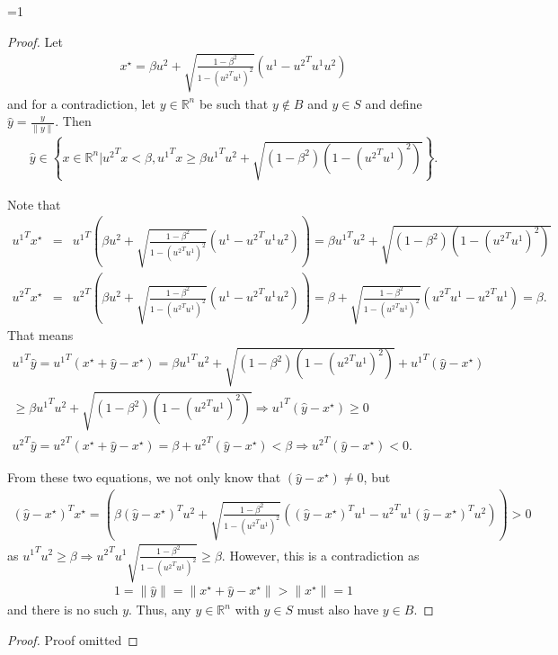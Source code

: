 \documentclass{article}
\theoremstyle{case}
\newcommand{\rn}{{\mathbb R^{n}}}
\def\includeproofs{1}
\begin{document}
\ifnum\includeproofs=1
\begin{proof}
Let 
\begin{align*}
x^{\star} = \beta u^2 + \sqrt{\frac{1 - \beta^2}{1 - ({u^2}^Tu^1)^2}} (u^1 - {u^2}^Tu^1 u^2 )
\end{align*} and for a contradiction, let $y \in \rn$ be such that $y \not \in B$ and $y \in S$ and define $\hat y = \frac{y}{\|y\|}$.
Then
\begin{align*}
\hat y \in \left\{x \in \rn | {u^2}^Tx < \beta, {u^1}^Tx \ge \beta {u^1}^Tu^2 + \sqrt{(1 - \beta^2)\left(1 - ({u^2}^Tu^1)^2\right)} \right\}.
\end{align*}

Note that
\begin{align}
{u^1}^Tx^{\star} &=& {u^1}^T\left(\beta u^2 + \sqrt{\frac{1 - \beta^2}{1 - ({u^2}^Tu^1)^2}} (u^1 - {u^2}^Tu^1 u^2 )\right) = 
\beta {u^1}^Tu^2 + \sqrt{(1 - \beta^2)\left(1 - ({u^2}^Tu^1)^2\right)} \\
{u^2}^Tx^{\star} &=& {u^2}^T\left(\beta u^2 + \sqrt{\frac{1 - \beta^2}{1 - ({u^2}^Tu^1)^2}} (u^1 - {u^2}^Tu^1 u^2 )\right) = 
\beta + \sqrt{\frac{1 - \beta^2}{1 - ({u^2}^Tu^1)^2}} ({u^2}^Tu^1 - {u^2}^Tu^1 ) = \beta.
\end{align}
That means
\begin{align}
{u^1}^T\hat y = {u^1}^T\left(x^{\star} + \hat y - x^{\star}\right) = \beta {u^1}^Tu^2 + \sqrt{(1 - \beta^2)\left(1 - ({u^2}^Tu^1)^2\right)} + {u^1}^T\left(\hat y - x^{\star}\right) \\
\ge \beta {u^1}^Tu^2 + \sqrt{(1 - \beta^2)\left(1 - ({u^2}^Tu^1)^2\right)} 
\Longrightarrow {u^1}^T\left(\hat y - x^{\star}\right) \ge 0 \\
{u^2}^T\hat y = {u^2}^T\left(x^{\star} + \hat y - x^{\star}\right) = \beta + {u^2}^T\left(\hat y - x^{\star}\right) < \beta
\Longrightarrow {u^2}^T\left(\hat y - x^{\star}\right) < 0. \label{the_difference_is_nonzero}
\end{align}

From these two equations, we not only know that $\left(\hat y - x^{\star}\right) \ne 0$, but
\begin{align*}
{\left(\hat y - x^{\star}\right)}^Tx^{\star} = 
\left(\beta {\left(\hat y - x^{\star}\right)}^Tu^2 + \sqrt{\frac{1 - \beta^2}{1 - ({u^2}^Tu^1)^2}} \left({\left(\hat y - x^{\star}\right)}^Tu^1 - {u^2}^Tu^1 {\left(\hat y - x^{\star}\right)}^Tu^2 \right)\right) > 0
\end{align*}
as ${u^1}^Tu^2 \ge \beta \Longrightarrow {u^2}^Tu^1\sqrt{\frac{1 - \beta^2}{1 - ({u^2}^Tu^1)^2}} \ge \beta$.
However, this is a contradiction as
\begin{align*}
1 = \|\hat y\| = \|x^{\star} + \hat y - x^{\star}\| > \|x^{\star}\| = 1
\end{align*}
and there is no such $y$.
Thus, any $y \in\rn$ with $y \in S$ must also have $y \in B$.
\end{proof}
\else
\begin{proof}
Proof omitted
\end{proof}
\fi
\end{document}

